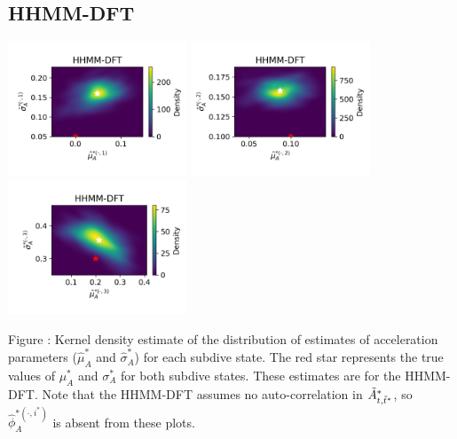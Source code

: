 \documentclass{article}
\begin{document}
        \subsection{HHMM-DFT}
        \begin{center}
        \includegraphics[width=2.1in]{../Plots/hhmm_FV_uncorr_MLE_density_A_0_0.png}
        \includegraphics[width=2.1in]{../Plots/hhmm_FV_uncorr_MLE_density_A_0_1.png}
        \includegraphics[width=2.1in]{../Plots/hhmm_FV_uncorr_MLE_density_A_0_2.png}
        \end{center}
        
        \noindent Figure : Kernel density estimate of the distribution of estimates of acceleration parameters ($\hat \mu^*_A$ and $\hat \sigma^*_A$) for each subdive state. The red star represents the true values of $\mu^*_A$ and $\sigma^*_A$ for both subdive states. These estimates are for the HHMM-DFT. Note that the HHMM-DFT assumes no auto-correlation in $\tilde{A}^*_{t,\tilde t^*}$, so $\hat \phi_A^{*(\cdot,i^*)}$ is absent from these plots.
        \addtocounter{fignum}{1}
        
\end{document}
